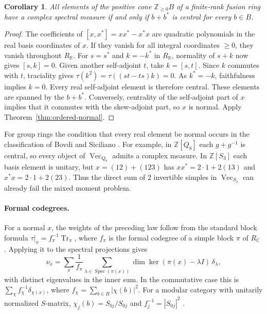 \documentclass[11pt,reqno]{amsart}
\newtheorem{corollary}[theorem]{Corollary}
\theoremstyle{definition}
\newcommand{\RR}{\mathbb R}
\newcommand{\CC}{\mathbb C}
\newcommand{\ZZ}{\mathbb Z}
\newcommand{\Vect}{\operatorname{Vec}}
\begin{document}
\begin{corollary}\label{cor:allnormal}
All elements of the positive cone $\ZZ_{\geq0}B$ of a finite-rank fusion ring
have a complex spectral measure if and only if $b+b^*$ is central for every $b\in B$.
\end{corollary}
\begin{proof}
The coefficients of $[x,x^*]=xx^*-x^*x$ are quadratic polynomials in the
real basis coordinates of $x$. If they vanish for all integral coordinates $\geq0$,
they vanish throughout $R_{\RR}$. For $s=s^*$ and $k=-k^*$ in $R_{\RR}$,
normality of $s+k$ now gives $[s,k]=0$. Given another self-adjoint $t$, take
$k=[s,t]$. Since $k$ commutes with $t$, traciality gives
$\tau(k^2)=\tau((st-ts)k)=0$. As $k^*=-k$, faithfulness implies $k=0$.
Every real self-adjoint element is therefore central. These elements are spanned by
the $b+b^*$. Conversely, centrality of the self-adjoint part of $x$
implies that it commutes with the skew-adjoint part, so $x$ is normal.
Apply Theorem~\ref{thm:ordered-normal}.
\end{proof}

For group rings the condition that every real element be normal occurs in the classification of Bovdi and Siciliano \cite{BS}. For example, in $\ZZ[Q_8]$ each $g+g^{-1}$ is central, so every object of
$\Vect_{Q_8}$ admits a complex measure. In $\ZZ[S_3]$ each basis element
is unitary, but $x=(12)+(123)$ has $xx^*=2\cdot1+2(13)$ and
$x^*x=2\cdot1+2(23)$. Thus the direct sum of 2 invertible simples in
$\Vect_{S_3}$ can already fail the mixed moment problem.

\paragraph{Formal codegrees.}\label{thm:plancherel}
For a normal $x$, the weights of the preceding law follow from the standard block formula $\tau|_\pi=f_\pi^{-1}\operatorname{Tr}_\pi$, where $f_\pi$ is the formal codegree of a simple block $\pi$ of $R_\CC$ \cite[Lemma~2.3 and Example~2.4]{Ost}. Applying it to the spectral projections gives
\[
 \nu_x=\sum_{\pi}\frac{1}{f_\pi}
   \sum_{\lambda\in\operatorname{Spec}(\pi(x))}
     \dim\ker(\pi(x)-\lambda I)\,\delta_\lambda ,
\]
with distinct eigenvalues in the inner sum. In the commutative case this is $\sum_\chi f_\chi^{-1}\delta_{\chi(x)}$, where $f_\chi=\sum_{b\in B}|\chi(b)|^2$. For a modular category with unitarily normalized $S$-matrix, $\chi_j(b)=S_{bj}/S_{0j}$ and $f_j^{-1}=|S_{0j}|^2$ \cite[Chapter~8]{EGNO}.
\end{document}
